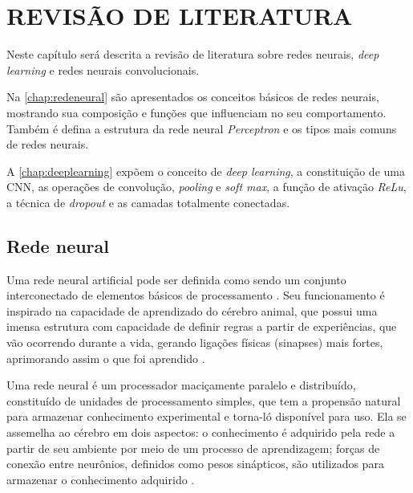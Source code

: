 
\chapter{REVISÃO DE LITERATURA}
\label{chap:fundamentacaoTeorica}

Neste capítulo será descrita a revisão de literatura sobre redes neurais, \textit{deep learning} e redes neurais convolucionais.
\par Na \autoref{chap:redeneural} são apresentados os conceitos básicos de redes neurais, mostrando sua composição e funções que influenciam no seu comportamento. Também é defina a estrutura da rede neural \textit{Perceptron} e os tipos mais comuns de redes neurais.
\par A \autoref{chap:deeplearning} expõem o conceito de \textit{deep learning}, a constituição de uma CNN, as operações de convolução, \textit{pooling} e \textit{soft max}, a função de ativação \textit{ReLu}, a técnica de \textit{dropout} e as camadas totalmente conectadas.  

\section{Rede neural}
\label{chap:redeneural}
Uma rede neural artificial pode ser definida como sendo um conjunto interconectado de elementos básicos de processamento \cite{Gurney1997}. Seu funcionamento é inspirado na capacidade de aprendizado do cérebro animal, que possui uma imensa estrutura com capacidade de definir regras a partir de experiências, que vão ocorrendo durante a vida, gerando ligações físicas (sinapses) mais fortes, aprimorando assim o que foi aprendido \cite{haykin2001}.
\begin{citacao}
  Uma rede neural é um processador maciçamente paralelo e distribuído, constituído de unidades de processamento simples, que tem a propensão natural para armazenar conhecimento experimental e torna-ló disponível para uso. Ela se assemelha ao cérebro em dois aspectos: o conhecimento é adquirido pela rede a partir de seu ambiente por meio de um processo de aprendizagem; forças de conexão entre neurônios, definidos como pesos sinápticos, são utilizados para armazenar o conhecimento adquirido \cite{haykin2001}.
\end{citacao}

